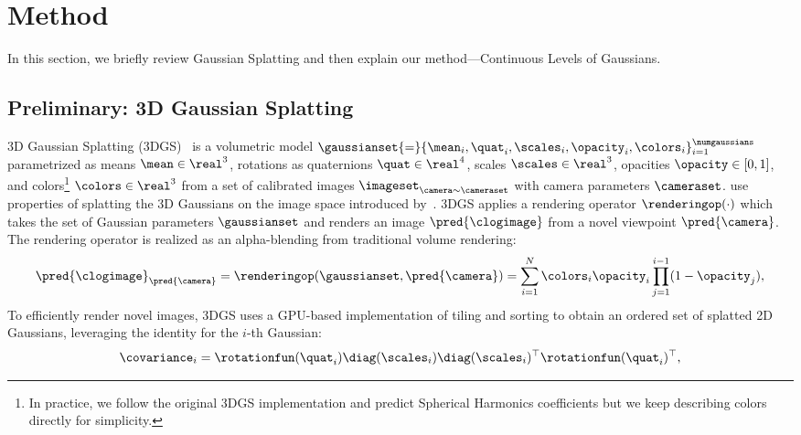 \section{Method}

  In this section, we briefly review Gaussian Splatting and then explain our
  method---Continuous Levels of Gaussians.

  \subsection{Preliminary: 3D Gaussian Splatting}

    3D Gaussian Splatting (3DGS)~\cite{kerbl20233d}
    is a volumetric model $\gaussianset{=}\{\mean_i,\quat_i, \scales_i, \opacity_i, \colors_i\}_{i=1}^{\numgaussians}$
    parametrized as means $\mean \in \real^3$,
    rotations as quaternions $\quat \in \real^4$,
    scales $\scales \in \real^3$,
    opacities $\opacity \in [0, 1]$,
    and colors\footnote{In practice, we follow the original 3DGS implementation and predict Spherical Harmonics coefficients but we keep describing colors directly for simplicity.} $\colors \in \real^3$
    from a set of calibrated images $\imageset_{\camera\sim\cameraset}$ with camera parameters $\cameraset$.
    \citet{kerbl20233d} use properties of splatting the 3D Gaussians on the image space introduced by~\citet{zwicker2001ewa}. %
    3DGS applies a rendering operator $\renderingop(\cdot)$ which takes the set of Gaussian parameters $\gaussianset$ and renders an image $\pred{\clogimage}$ from a novel viewpoint $\pred{\camera}$.
    The rendering operator is realized as an alpha-blending from traditional volume rendering:
    \begin{equation}
      \label{eq:clog-rendering-image}
      \pred{\clogimage}_{\pred{\camera}} = \renderingop(\gaussianset, \pred{\camera}) = \sum_{i=1}^N \colors_i \opacity_i \prod_{j=1}^{i-1} (1 - \opacity_j),
    \end{equation}
    To efficiently render novel images, 3DGS uses a GPU-based implementation of tiling and sorting to obtain an ordered set of splatted 2D Gaussians, leveraging the identity for the $i$-th Gaussian:
    \begin{equation*}
      \covariance_i = \rotationfun(\quat_i)\diag(\scales_i)\diag(\scales_i)^\top\rotationfun(\quat_i)^\top,
    \end{equation*}
